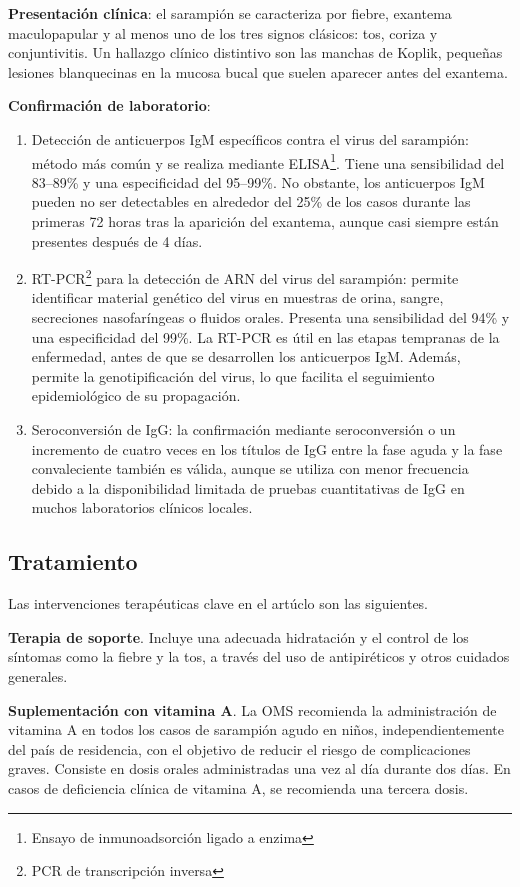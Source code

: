 \textbf{Presentación clínica}: el sarampión se caracteriza por fiebre, exantema maculopapular y al menos uno de los tres signos clásicos: tos, coriza y conjuntivitis. Un hallazgo clínico distintivo son las manchas de Koplik, pequeñas lesiones blanquecinas en la mucosa bucal que suelen aparecer antes del exantema.

\textbf{Confirmación de laboratorio}:
\begin{enumerate}
    \item Detección de anticuerpos IgM específicos contra el virus del sarampión: método más común y se realiza mediante ELISA\footnote{Ensayo de inmunoadsorción ligado a enzima}. Tiene una sensibilidad del 83–89\% y una especificidad del 95–99\%. No obstante, los anticuerpos IgM pueden no ser detectables en alrededor del 25\% de los casos durante las primeras 72 horas tras la aparición del exantema, aunque casi siempre están presentes después de 4 días.
    \item RT-PCR\footnote{PCR de transcripción inversa} para la detección de ARN del virus del sarampión: permite identificar material genético del virus en muestras de orina, sangre, secreciones nasofaríngeas o fluidos orales. Presenta una sensibilidad del 94\% y una especificidad del 99\%. La RT-PCR es útil en las etapas tempranas de la enfermedad, antes de que se desarrollen los anticuerpos IgM. Además, permite la genotipificación del virus, lo que facilita el seguimiento epidemiológico de su propagación.
    \item Seroconversión de IgG: la confirmación mediante seroconversión o un incremento de cuatro veces en los títulos de IgG entre la fase aguda y la fase convaleciente también es válida, aunque se utiliza con menor frecuencia debido a la disponibilidad limitada de pruebas cuantitativas de IgG en muchos laboratorios clínicos locales.
\end{enumerate}

\subsection{Tratamiento}
Las intervenciones terapéuticas clave en el artúclo \cite{graber2020update} son las siguientes.

\textbf{Terapia de soporte}.
Incluye una adecuada hidratación y el control de los síntomas como la fiebre y la tos, a través del uso de antipiréticos y otros cuidados generales.

\textbf{Suplementación con vitamina A}.
La OMS recomienda la administración de vitamina A en todos los casos de sarampión agudo en niños, independientemente del país de residencia, con el objetivo de reducir el riesgo de complicaciones graves.
Consiste en dosis orales administradas una vez al día durante dos días. En casos de deficiencia clínica de vitamina A, se recomienda una tercera dosis.

